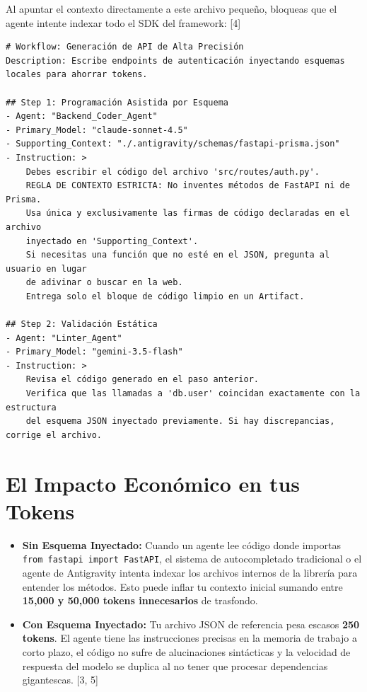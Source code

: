 \documentclass[12pt, a4paper]{article}
\begin{document}
Al apuntar el contexto directamente a este archivo pequeño, bloqueas que el agente intente indexar todo el SDK del framework: [4]

\begin{verbatim}
# Workflow: Generación de API de Alta Precisión
Description: Escribe endpoints de autenticación inyectando esquemas locales para ahorrar tokens.

## Step 1: Programación Asistida por Esquema
- Agent: "Backend_Coder_Agent"
- Primary_Model: "claude-sonnet-4.5"
- Supporting_Context: "./.antigravity/schemas/fastapi-prisma.json"
- Instruction: >
    Debes escribir el código del archivo 'src/routes/auth.py'.
    REGLA DE CONTEXTO ESTRICTA: No inventes métodos de FastAPI ni de Prisma.
    Usa única y exclusivamente las firmas de código declaradas en el archivo
    inyectado en 'Supporting_Context'.
    Si necesitas una función que no esté en el JSON, pregunta al usuario en lugar
    de adivinar o buscar en la web.
    Entrega solo el bloque de código limpio en un Artifact.

## Step 2: Validación Estática
- Agent: "Linter_Agent"
- Primary_Model: "gemini-3.5-flash"
- Instruction: >
    Revisa el código generado en el paso anterior.
    Verifica que las llamadas a 'db.user' coincidan exactamente con la estructura
    del esquema JSON inyectado previamente. Si hay discrepancias, corrige el archivo.
\end{verbatim}

\section*{El Impacto Económico en tus Tokens}

\begin{itemize}
    \item \textbf{Sin Esquema Inyectado:} Cuando un agente lee código donde importas \texttt{from fastapi import FastAPI}, el sistema de autocompletado tradicional o el agente de Antigravity intenta indexar los archivos internos de la librería para entender los métodos. Esto puede inflar tu contexto inicial sumando entre \textbf{15,000 y 50,000 tokens innecesarios} de trasfondo.
    \item \textbf{Con Esquema Inyectado:} Tu archivo JSON de referencia pesa escasos \textbf{250 tokens}. El agente tiene las instrucciones precisas en la memoria de trabajo a corto plazo, el código no sufre de alucinaciones sintácticas y la velocidad de respuesta del modelo se duplica al no tener que procesar dependencias gigantescas. [3, 5]
\end{itemize}
\end{document}
